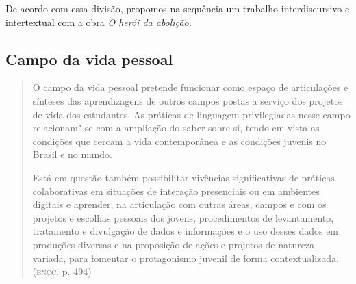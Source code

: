 \documentclass[12pt]{extarticle}
\begin{document}
De acordo com essa divisão, propomos na sequência um trabalho
interdiscursivo e intertextual com a obra \emph{O herói da abolição.}


\subsection{Campo da vida pessoal}

\begin{quote}
O campo da vida pessoal pretende funcionar como espaço de articulações
e sínteses das aprendizagens de outros campos postas a serviço dos
projetos de vida dos estudantes. As práticas de linguagem privilegiadas
nesse campo relacionam"-se com a ampliação do saber sobre si, tendo em
vista as condições que cercam a vida contemporânea e as condições
juvenis no Brasil e no mundo.

Está em questão também possibilitar vivências significativas de práticas
colaborativas em situações de interação presenciais ou em ambientes
digitais e aprender, na articulação com outras áreas, campos e com os
projetos e escolhas pessoais dos jovens, procedimentos de levantamento,
tratamento e divulgação de dados e informações e o uso desses dados em
produções diversas e na proposição de ações e projetos de natureza
variada, para fomentar o protagonismo juvenil de forma
contextualizada. (\textsc{bncc}, p. 494)
\end{quote}
\end{document}

